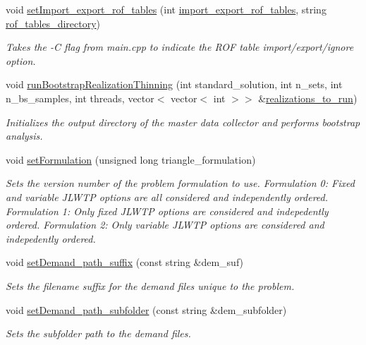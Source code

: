 \begin{DoxyCompactItemize}
void \mbox{\hyperlink{classProblem_abd1e1e82b44c6ce5f7dc22e0534a6cac}{set\+Import\+\_\+export\+\_\+rof\+\_\+tables}} (int \mbox{\hyperlink{classProblem_ac5a286f34cec786a0ad56c77783a201c}{import\+\_\+export\+\_\+rof\+\_\+tables}}, string \mbox{\hyperlink{classProblem_abc641b49a4defb0dbabafbf3f9dbca6e}{rof\+\_\+tables\+\_\+directory}})
\begin{DoxyCompactList}\small\item\em Takes the -\/C flag from main.\+cpp to indicate the R\+OF table import/export/ignore option. \end{DoxyCompactList}\item 
void \mbox{\hyperlink{classProblem_a3604aafc0cf731fc9dfa8589ec8995ce}{run\+Bootstrap\+Realization\+Thinning}} (int standard\+\_\+solution, int n\+\_\+sets, int n\+\_\+bs\+\_\+samples, int threads, vector$<$ vector$<$ int $>$$>$ \&\mbox{\hyperlink{classProblem_af9ed9265d0d2b4918bd468d717429de1}{realizations\+\_\+to\+\_\+run}})
\begin{DoxyCompactList}\small\item\em Initializes the output directory of the master data collector and performs bootstrap analysis. \end{DoxyCompactList}\item 
void \mbox{\hyperlink{classProblem_aeb825305f6bdf0df0cadcf0bb7da458f}{set\+Formulation}} (unsigned long triangle\+\_\+formulation)
\begin{DoxyCompactList}\small\item\em Sets the version number of the problem formulation to use. Formulation 0\+: Fixed and variable J\+L\+W\+TP options are all considered and independently ordered. Formulation 1\+: Only fixed J\+L\+W\+TP options are considered and indepedently ordered. Formulation 2\+: Only variable J\+L\+W\+TP options are considered and indepedently ordered. \end{DoxyCompactList}\item 
void \mbox{\hyperlink{classProblem_a442f72921a52a1087c67723a801c8a44}{set\+Demand\+\_\+path\+\_\+suffix}} (const string \&dem\+\_\+suf)
\begin{DoxyCompactList}\small\item\em Sets the filename suffix for the demand files unique to the problem. \end{DoxyCompactList}\item 
void \mbox{\hyperlink{classProblem_a16f7de201ec1a9a2072c85819e7dde3c}{set\+Demand\+\_\+path\+\_\+subfolder}} (const string \&dem\+\_\+subfolder)
\begin{DoxyCompactList}\small\item\em Sets the subfolder path to the demand files. \end{DoxyCompactList}\end{DoxyCompactItemize}

